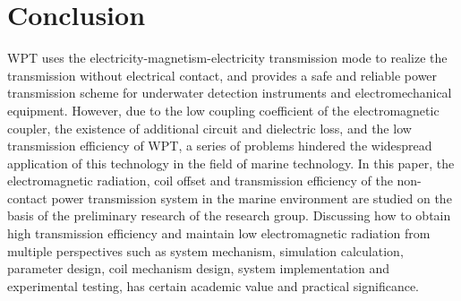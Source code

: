 \chapter{Conclusion}

WPT uses the electricity-magnetism-electricity transmission mode to realize the transmission without electrical contact, and provides a safe and reliable power transmission scheme for underwater detection instruments and electromechanical equipment. However, due to the low coupling coefficient of the electromagnetic coupler, the existence of additional circuit and dielectric loss, and the low transmission efficiency of WPT, a series of problems hindered the widespread application of this technology in the field of marine technology. In this paper, the electromagnetic radiation, coil offset and transmission efficiency of the non-contact power transmission system in the marine environment are studied on the basis of the preliminary research of the research group. Discussing how to obtain high transmission efficiency and maintain low electromagnetic radiation from multiple perspectives such as system mechanism, simulation calculation, parameter design, coil mechanism design, system implementation and experimental testing, has certain academic value and practical significance.

